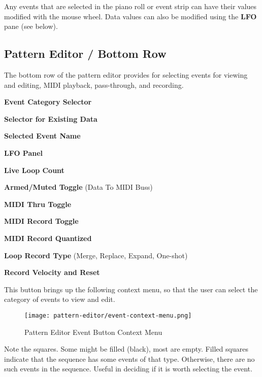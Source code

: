   Any events that are selected in the piano roll or event strip can have
   their values modified with the mouse wheel.
   Data values can also be modified using the \textbf{LFO} pane (see below).

\subsection{Pattern Editor / Bottom Row}
\label{subsec:pattern_editor_bottom}

   The bottom row of the pattern editor provides for
   selecting events for viewing and editing, MIDI playback,
   pass-through, and recording.

   \begin{enumber}
      \item \textbf{Event Category Selector}
      \item \textbf{Selector for Existing Data}
      \item \textbf{Selected Event Name}
      \item \textbf{LFO Panel}
      \item \textbf{Live Loop Count}
      \item \textbf{Armed/Muted Toggle} (Data To MIDI Buss)
      \item \textbf{MIDI Thru Toggle}
      \item \textbf{MIDI Record Toggle}
      \item \textbf{MIDI Record Quantized}
      \item \textbf{Loop Record Type} (Merge, Replace, Expand, One-shot)
      \item \textbf{Record Velocity and Reset}
   \end{enumber}

   \setcounter{ItemCounter}{0}      %

   This button brings up the following context menu, so that the user can
   select the category of events to view and edit.

\begin{figure}[H]
   \centering 
   \texttt{[image: pattern-editor/event-context-menu.png]}
   \caption{Pattern Editor Event Button Context Menu}
   \label{fig:pattern_editor_bottom_event_context_menu}
\end{figure}

   Note the squares.  Some might be filled (black), most are empty.
   Filled squares indicate that the sequence has some events of that type.
   Otherwise, there are no such events in the sequence.
   Useful in deciding if it is worth selecting the event.

